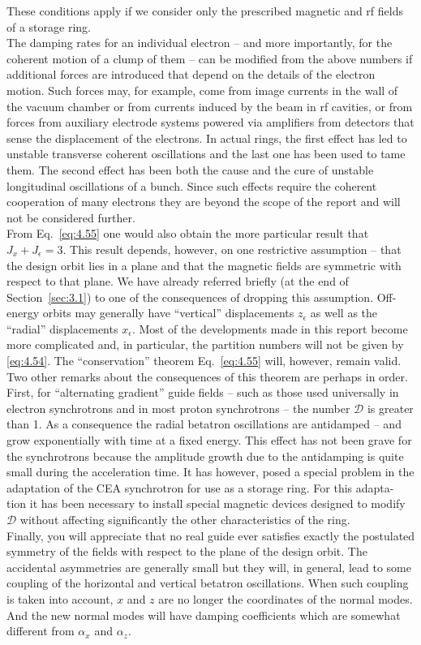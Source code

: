  These conditions apply if we consider only the prescribed magnetic and rf fields of a storage ring.\\
The damping rates for an individual electron -- and more importantly, for the coherent motion of a clump of them -- can be modified from the above numbers if additional forces are introduced
 that depend on the details of the electron motion. Such forces may, for example, come from image currents in the wall of the vacuum chamber or from currents induced by the beam in rf cavities, or from forces from auxiliary electrode systems powered via amplifiers from detectors that sense the displacement of the electrons. In actual rings, the first effect has led to unstable transverse coherent oscillations and the last one has been used to tame them. The
second effect has been both the cause and the cure of unstable longitudinal oscillations of a bunch. Since such effects require the coherent cooperation of many electrons they are beyond the scope of the report and will not be considered further.\\
From Eq.~\eqref{eq:4.55} one would also obtain the more particular result that $J_x+ J_\epsilon = 3$. This result depends, however, on one restrictive assumption -- that the design orbit lies in a plane and that the magnetic fields are symmetric with respect to that plane. We have already referred briefly (at the end of Section~\ref{sec:3.1}) to one of the consequences of dropping this assumption. Off-energy orbits may generally have ``vertical'' displacements $z_\epsilon$ as well as the ``radial'' displacements $x_\epsilon$. Most of the developments
 made in this report become more complicated and, in particular, the partition numbers will not be given by \eqref{eq:4.54}. The ``conservation'' theorem Eq.~\eqref{eq:4.55} will, however,
 remain valid.\\
Two other remarks about the consequences of this theorem are perhaps in order. First, for ``alternating gradient'' guide fields -- such as those used universally in electron synchrotrons
 and in most proton synchrotrons -- the number $\mathscr{D}$ is greater than 1. As a consequence the radial betatron oscillations are antidamped -- and grow exponentially with time at a fixed energy. This effect has not been grave for the synchrotrons because the amplitude growth due to the antidamping is quite small during the acceleration time. It has however, posed a special problem in the adaptation of the CEA synchrotron for use as a storage ring. For this adapta-
tion it has been necessary to install special magnetic devices designed to modify $\mathscr{D}$
 without affecting significantly the other characteristics of the ring.\\
 Finally, you will appreciate that no real guide ever satisfies exactly the postulated symmetry
 of the fields with respect to the plane of the design orbit. The accidental asymmetries
 are generally small but they will, in general, lead to some coupling of the horizontal and vertical betatron oscillations. When such coupling is taken into account, $x$ and $z$ are no longer the coordinates of the normal modes. And the new normal modes will have damping coefficients which are somewhat different from $\alpha_x$ and $\alpha_z$.
